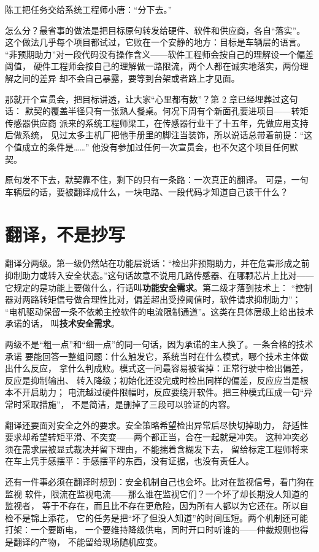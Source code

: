 陈工把任务交给系统工程师小唐：“分下去。”

怎么分？最省事的做法是把目标原句转发给硬件、软件和供应商，各自“落实”。
这个做法几乎每个项目都试过，它败在一个安静的地方：目标是车辆层的语言。
“非预期助力”对一段代码没有操作含义——软件工程师会按自己的理解设一个偏差阈值，
硬件工程师会按自己的理解做一路限流，两个人都在诚实地落实，两份理解之间的差异
却不会自己暴露，要等到台架或者路上才见面。

那就开个宣贯会，把目标讲透，让大家“心里都有数”？第 2 章已经埋葬过这句话：
默契的覆盖半径只有一张熟人餐桌。何况下周有个新面孔要进项目——转矩传感器供应商
派来的系统工程师梁工，在传感器行业干了十五年，先做应用支持后做系统，
见过太多主机厂把他手册里的脚注当装饰，所以说话总带着前提：“这个值成立的条件是\ldots{}\ldots{}”
他没有参加过任何一次宣贯会，也不欠这个项目任何默契。

原句发不下去，默契靠不住，剩下的只有一条路：一次真正的翻译。
可是，一句车辆层的话，要被翻译成什么，一块电路、一段代码才知道自己该干什么？

\section{翻译，不是抄写}

翻译分两级。第一级仍然站在功能层说话：“检出非预期助力，并在危害形成之前
抑制助力或转入安全状态。”这句话故意不说用几路传感器、在哪颗芯片上比对——
它规定的是功能上要做什么，行话叫\textbf{功能安全需求}。第二级才落到技术上：
“控制器对两路转矩信号做合理性比对，偏差超出受控阈值时，软件请求抑制助力”；
“电机驱动保留一条不依赖主控软件的电流限制通道”。这类在具体层级上给出技术承诺的话，
叫\textbf{技术安全需求}。

两级不是“粗一点”和“细一点”的同一句话，因为承诺的主人换了。一条合格的技术承诺
要能回答一整组问题：什么触发它，系统当时在什么模式，哪个技术主体做出什么反应，
拿什么判成败。模式这一问最容易被省掉：正常行驶中检出偏差，反应是抑制输出、
转入降级；初始化还没完成时检出同样的偏差，反应应当是根本不开启助力；
电流越过硬件限幅时，反应要绕开软件。把三种模式压成一句“异常时采取措施”，
不是简洁，是删掉了三段可以验证的内容。

翻译还要面对安全之外的要求。安全策略希望检出异常后尽快切掉助力，
舒适性要求却希望转矩平滑、不突变——两个都正当，合在一起就是冲突。
这种冲突必须在需求层被显式裁决并留下理由，不能揣着含糊发下去，
留给标定工程师将来在车上凭手感摆平：手感摆平的东西，没有证据，也没有责任人。

还有一件事必须在翻译时想到：安全机制自己也会坏。比对在监视信号，看门狗在监视
软件，限流在监视电流——那么谁在监视它们？一个坏了却长期没人知道的监视者，
等于不存在，而且比不存在更危险，因为所有人都以为它还在。所以自检不是锦上添花，
它的任务是把“坏了但没人知道”的时间压短。两个机制还可能打架：一个要断电，
一个要维持降级供电，同时开口时听谁的——仲裁规则也得是翻译的产物，
不能留给现场随机应变。

